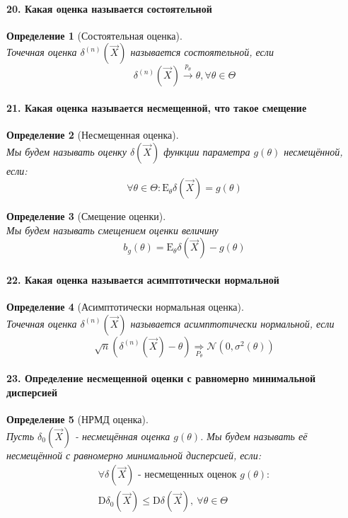 \documentclass[titlepage]{article}
\newcommand{\sE}{\mathrm{E}}
\newcommand{\sD}{\mathrm{D}}
\newtheorem{definition}{Определение}
\begin{document}
\paragraph{20. Какая оценка называется состоятельной}
\begin{definition}[Состоятельная оценка] ~\\
	 Точечная оценка $\delta^{(n)}(\vec{X})$ называется состоятельной, если
	 $$\delta^{(n)}(\vec{X}) \xrightarrow{p_\theta} \theta,\forall \theta \in \Theta $$
\end{definition}

\paragraph{21. Какая оценка называется несмещенной, что такое смещение}
\begin{definition}[Несмещенная оценка] ~\\
	Мы будем называть оценку $\delta(\vec X)$ функции параметра $g(\theta)$ несмещённой, если:
	\[\forall \theta \in \Theta: \sE_\theta\delta(\vec X) = g(\theta)\]
\end{definition}
\begin{definition}[Смещение оценки] ~\\
	Мы будем называть смещением оценки величину
	\[b_g(\theta) = \sE_\theta\delta(\vec X) - g(\theta)\]
\end{definition}

\paragraph{22. Какая оценка называется асимптотически нормальной}
\begin{definition}[Асимптотически нормальная оценка] ~\\
	Точечная оценка $\delta^{(n)}(\vec{X})$ называется асимптотически нормальной, если
	$$\sqrt{n} (\delta^{(n)}(\vec{X}) - \theta) \underset{P_\theta}{\Rightarrow} \mathcal{N}(0,\sigma^2(\theta))$$
\end{definition}

\paragraph{23. Определение несмещенной оценки с равномерно минимальной дисперсией}
\begin{definition}[НРМД оценка] ~\\
	Пусть $\delta_0(\vec X)$ - несмещённая оценка $g(\theta)$. Мы будем называть её несмещённой с равномерно минимальной дисперсией, если:
	\begin{gather*}		
		\forall \delta(\vec X) \text{ - несмещенных оценок } g(\theta):\\
		\sD\delta_0(\vec X) \leq \sD\delta(\vec X),\ \forall \theta \in \Theta
	\end{gather*}
\end{definition}
\end{document}
